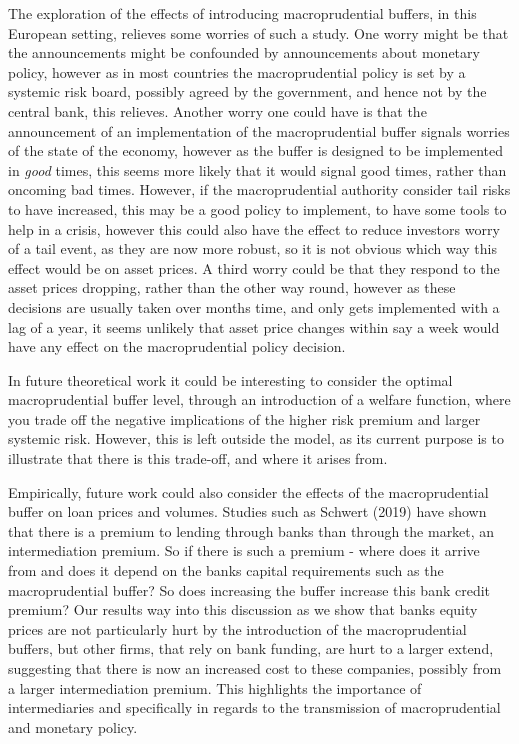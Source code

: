 \documentclass[11pt]{article}
\begin{document}
The exploration of the effects of introducing macroprudential buffers, in this European setting, relieves some worries of such a study. One worry might be that the announcements might be confounded by announcements about monetary policy, however as in most countries the macroprudential policy is set by a systemic risk board, possibly agreed by the government, and hence not by the central bank, this relieves. Another worry one could have is that the announcement of an implementation of the macroprudential buffer signals worries of the state of the economy, however as the buffer is designed to be implemented in \emph{good} times, this seems more likely that it would signal good times, rather than oncoming bad times. However, if the macroprudential authority consider tail risks to have increased, this may be a good policy to implement, to have some tools to help in a crisis, however this could also have the effect to reduce investors worry of a tail event, as they are now more robust, so it is not obvious which way this effect would be on asset prices. A third worry could be that they respond to the asset prices dropping, rather than the other way round, however as these decisions are usually taken over months time, and only gets implemented with a lag of a year, it seems unlikely that asset price changes within say a week would have any effect on the macroprudential policy decision.

In future theoretical work it could be interesting to consider the optimal macroprudential buffer level, through an introduction of a welfare function, where you trade off the negative implications of the higher risk premium and larger systemic risk.  However, this is left outside the model, as its current purpose is to illustrate that there is this trade-off, and where it arises from.

Empirically, future work could also consider the effects of the macroprudential buffer on loan prices and volumes.
Studies such as Schwert (2019) have shown that there is a premium to lending through banks than through the market, an intermediation premium. So if there is such a premium - where does it arrive from and does it depend on the banks capital requirements such as the macroprudential buffer? So does increasing the buffer increase this bank credit premium? Our results way into this discussion as we show that banks equity prices are not particularly hurt by the introduction of the macroprudential buffers, but other firms, that rely on bank funding, are hurt to a larger extend, suggesting that there is now an increased cost to these companies, possibly from a larger intermediation premium. This highlights the importance of intermediaries and specifically in regards to the transmission of macroprudential and monetary policy.
\end{document}
